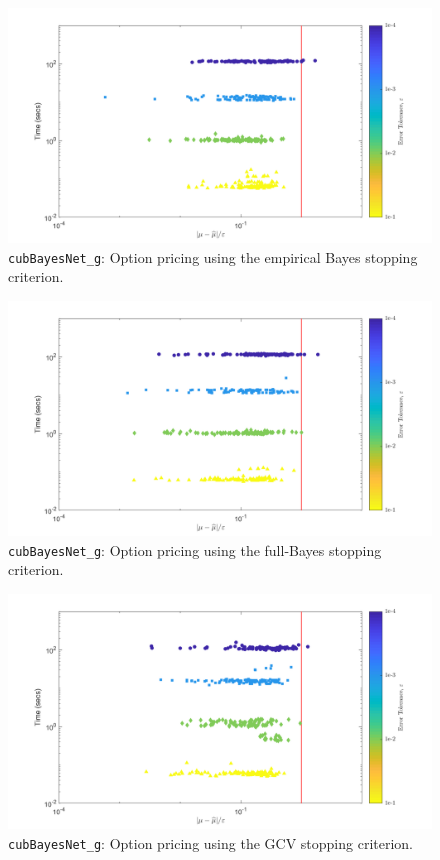 \documentclass{iitthesis}          %
\newcommand{\code}[1]{\texttt{#1}}
\begin{document}
{{{{{{\begin{figure}
	\centering
	\includegraphics[width=0.95\linewidth]{"Sobol_optPrice_guaranteed_time_MLE__d12_r1_2019-Jun-10"}
	\caption[Option pricing Guaranteed: MLE]{\code{cubBayesNet\_g}: Option pricing using the empirical Bayes stopping criterion.}
	\label{fig:Sobol-optprice-guaranteed-MLE}
\end{figure}
\begin{figure}
	\centering
	\includegraphics[width=0.95\linewidth]{"Sobol_optPrice_guaranteed_time_full__d12_r1_2019-Jun-10"}
	\caption[Option pricing Guaranteed: Full Bayes]{\code{cubBayesNet\_g}: Option pricing using the full-Bayes stopping criterion.}
	\label{fig:Sobol-optprice-guaranteed-FB}
\end{figure}
\begin{figure}
	\centering
	\includegraphics[width=0.95\linewidth]{"Sobol_optPrice_guaranteed_time_GCV__d12_r1_2019-Jun-10"}
	\caption[Option pricing Guaranteed: GCV]{\code{cubBayesNet\_g}: Option pricing using the GCV stopping criterion.}
	\label{fig:Sobol-optprice-guaranteed-GCV}
\end{figure}


}}}}}}
\end{document}
